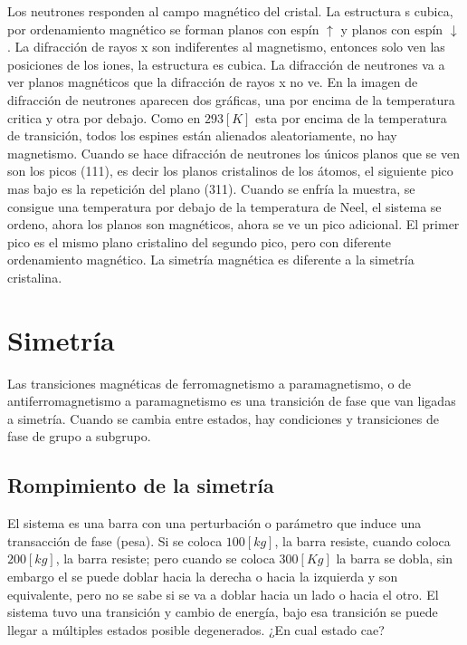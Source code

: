 \documentclass[11pt,fleqn]{book}
\begin{document}

Los neutrones responden al campo magnético del cristal. La estructura s cubica, por ordenamiento magnético se forman planos con espín $\uparrow$ y planos con espín $\downarrow$. La difracción de rayos x son indiferentes al magnetismo, entonces solo ven las posiciones de los iones, la estructura es cubica. La difracción de neutrones va a ver planos magnéticos que la difracción de rayos x no ve. En la imagen de difracción de neutrones aparecen dos gráficas, una por encima de la temperatura critica y otra por debajo. Como en $293[K]$ esta por encima de la temperatura de transición, todos los espines están alienados aleatoriamente, no hay magnetismo. Cuando se hace difracción de neutrones los únicos planos que se ven son los picos (111), es decir los planos cristalinos de los átomos, el siguiente pico mas bajo es la repetición del plano (311). Cuando se enfría la muestra, se consigue una temperatura por debajo de la temperatura de Neel, el sistema se ordeno, ahora los planos son magnéticos, ahora se ve un pico adicional. El primer pico es el mismo plano cristalino del segundo pico, pero con diferente ordenamiento magnético. La simetría magnética es diferente a la simetría cristalina. 

\chapter{Simetría}

Las transiciones magnéticas de ferromagnetismo a paramagnetismo, o de antiferromagnetismo a paramagnetismo es una transición de fase que van ligadas a simetría. Cuando se cambia entre estados, hay condiciones y transiciones de fase de grupo a subgrupo. 

    \section{Rompimiento de la simetría}
    
    
El sistema es una barra con una perturbación o parámetro que induce una transacción de fase (pesa). Si se coloca $100 [kg]$, la barra resiste, cuando coloca $200 [kg]$, la barra resiste; pero cuando se coloca $300 [Kg]$ la barra se dobla, sin embargo el se puede doblar hacia la derecha o hacia la izquierda y son equivalente, pero no se sabe si se va a doblar hacia un lado o hacia el otro. El sistema tuvo una transición y cambio de energía, bajo esa transición se puede llegar a múltiples estados posible degenerados. ¿En cual estado cae? 
\end{document}
